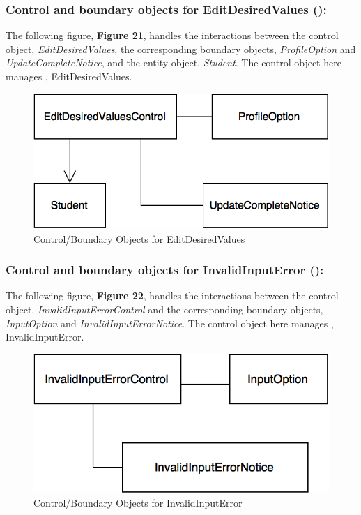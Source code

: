 \documentclass[12pt,letterpaper]{article}
\begin{document}
\subsubsection*{Control and boundary objects for EditDesiredValues (\editdesiredvalues{}):}

The following figure, {\bf Figure 21}, handles the interactions between the control object, {\it EditDesiredValues}, the corresponding boundary objects, 
{\it ProfileOption} and {\it UpdateCompleteNotice}, and the entity object, {\it Student}. The control object here manages \editdesiredvalues{}, EditDesiredValues.

\begin{figure}[H]
	\centering{}
	\includegraphics[scale=0.37]{imgs/cbod/edit-desired-values.png}
	\caption{Control/Boundary Objects for EditDesiredValues}    
\end{figure}

\newpage{}

\subsubsection*{Control and boundary objects for InvalidInputError (\invalidinputerror{}):}

The following figure, {\bf Figure 22}, handles the interactions between the control object, {\it InvalidInputErrorControl} and the corresponding boundary objects, 
{\it InputOption} and {\it InvalidInputErrorNotice}. The control object here manages \invalidinputerror{}, InvalidInputError.

\begin{figure}[H]
	\centering{}
	\includegraphics[scale=0.37]{imgs/cbod/invalid-input-error.png}
	\caption{Control/Boundary Objects for InvalidInputError}    
\end{figure}
\end{document}

